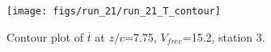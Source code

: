 \begin{figure}[H]
\centering
\texttt{[image: figs/run\_21/run\_21\_T\_contour]}
\caption{Contour plot of $\overline{t}$ at $z/c$=7.75, $V_{free}$=15.2, station 3.}
\label{fig:run_21_T_contour}
\end{figure}


